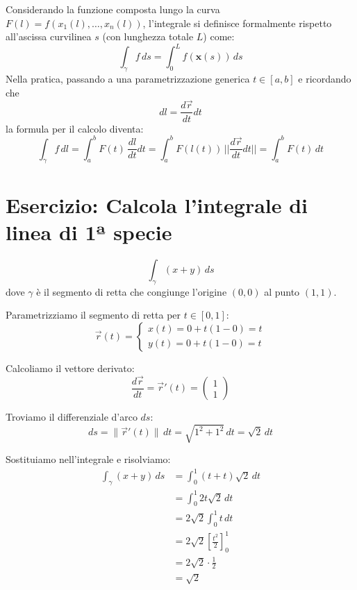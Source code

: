 Considerando la funzione composta lungo la curva $F(l) = f(x_1(l), \dots, x_n(l))$, l'integrale si definisce formalmente rispetto all'ascissa curvilinea $s$ (con lunghezza totale $L$) come:
\[
\int_{\gamma} f \, ds = \int_{0}^{L} f(\mathbf{x}(s)) \, ds
\]
Nella pratica, passando a una parametrizzazione generica $t \in [a,b]$ e ricordando che 
\[
dl = \frac{d\vec{r}}{dt} dt
\]
la formula per il calcolo diventa:
\[
\int_{\gamma} f \, dl = \int_a^b F(t) \, \frac{dl}{dt}dt = \int_a^b F(l(t)) \, ||\frac{d\vec{r}}{dt}dt|| = \int_a^b F(t) \, dt
\]

\section{Esercizio: Calcola l'integrale di linea di 1ª specie} 
\[
\int_{\gamma} (x+y) \, ds
\]
dove $\gamma$ è il segmento di retta che congiunge l'origine $(0,0)$ al punto $(1,1)$.

\vspace{0.5cm}

Parametrizziamo il segmento di retta per $t \in [0,1]$:
\[
\vec{r}(t) = 
\begin{cases} 
x(t) = 0 + t(1-0) = t \\ 
y(t) = 0 + t(1-0) = t 
\end{cases}
\]

Calcoliamo il vettore derivato:
\[
\frac{d\vec{r}}{dt} = \vec{r}'(t) = \begin{pmatrix} 1 \\ 1 \end{pmatrix}
\]

Troviamo il differenziale d'arco $ds$:
\[
ds = \|\vec{r}'(t)\| \, dt = \sqrt{1^2 + 1^2} \, dt = \sqrt{2} \, dt
\]

Sostituiamo nell'integrale e risolviamo:
\begin{align*}
\int_{\gamma} (x+y) \, ds &= \int_{0}^{1} (t + t) \sqrt{2} \, dt \\[1ex]
&= \int_{0}^{1} 2t\sqrt{2} \, dt \\[1ex]
&= 2\sqrt{2} \int_{0}^{1} t \, dt \\[1ex]
&= 2\sqrt{2} \left[ \frac{t^2}{2} \right]_{0}^{1} \\[1ex]
&= 2\sqrt{2} \cdot \frac{1}{2} \\[1ex]
&= \sqrt{2}
\end{align*}